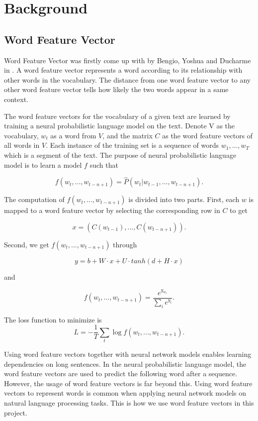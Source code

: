 \documentclass[modernstyle,12pt]{sjsuthesis}
\theoremstyle{definition}
\begin{document}
\chapter{Background}\label{chap:background}
\section{Word Feature Vector}

Word Feature Vector was firstly come up with by Bengio, Yoshua and Ducharme in \cite{bengio2003neural}. A word feature vector represents a word according to its relationship with other words in the vocabulary. The distance from one word feature vector to any other word feature vector tells how likely the two words appear in a same context.

The word feature vectors for the vocabulary of a given text are learned by training a neural probabilistic language model on the text. Denote V as the vocabulary, $w_t$ as a word from $V$, and the matrix $C$ as the word feature vectors of all words in $V$. Each instance of the training set is a sequence of words $w_1,...,w_T$ which is a segment of the text. The purpose of neural probabilistic language model is to learn a model $f$ such that

$$ f(w_t, ..., w_{t-n+1}) = \hat{P}(w_t | w_{t-1},...,w_{t-n+1}).$$

The computation of $f(w_t, ..., w_{t-n+1})$ is divided into two parts.
First, each $w$ is mapped to a word feature vector by selecting the corresponding row in $C$ to get

$$x=(C(w_{t-1}),... ,C(w_{t-n+1})).$$

Second, we get $f(w_t, ..., w_{t-n+1})$ through

$$y=b+W\cdot x + U\cdot tanh(d + H\cdot x)$$

and

$$ f(w_t, ..., w_{t-n+1}) = \frac{e^{y_{w_t}}}{\sum_{i}^{}e^{y_i}}.$$

The loss function to minimize is $$L = -\frac{1}{T}\sum _{t}^{} \log{f(w_t, ..., w_{t-n+1})}.$$


Using word feature vectors together with neural network models enables learning dependencies on long sentences. In the neural probabilistic language model, the word feature vectors are used to predict the following word after a sequence. However, the usage of word feature vectors is far beyond this. Using word feature vectors to represent words is common when applying neural network models on natural language processing tasks. This is how we use word feature vectors in this project.
\end{document}
